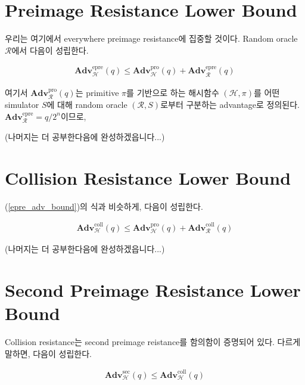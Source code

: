 \documentclass{article}
\newcommand{\adv}{\mathbf{Adv}}
\begin{document}
  \section{Preimage Resistance Lower Bound}
  우리는 여기에서 everywhere preimage resistance에 집중할 것이다.\cite{rogaway_cryptographic_2004} Random oracle \(\mathcal{R}\)에서 다음이 성립한다.\cite{andreeva_security_2011}

  \begin{align}\label{epre_adv_bound}
    \adv^\text{epre}_\mathcal{H}(q) \leq \adv^\text{pro}_\mathcal{H}(q) + \adv^\text{epre}_\mathcal{R}(q)
  \end{align}

  여기서 \(\adv^\text{pro}_\mathcal{R}(q)\)는 primitive \(\pi\)를 기반으로 하는 해시함수 \((\mathcal{H}, \pi)\)를 어떤 simulator \(S\)에 대해 random oracle \((\mathcal{R}, S)\)로부터 구분하는 advantage로 정의된다. \(\adv^\text{epre}_\mathcal{R}=q/2^n\)이므로,

  (나머지는 더 공부한다음에 완성하겠읍니다...)

  \section{Collision Resistance Lower Bound}
  (\ref{epre_adv_bound})의 식과 비슷하게, 다음이 성립한다.

  \begin{align*}
    \adv^\text{coll}_\mathcal{H}(q) \leq \adv^\text{pro}_\mathcal{H}(q) + \adv^\text{coll}_\mathcal{R}(q)
  \end{align*}

  (나머지는 더 공부한다음에 완성하겠읍니다...)

  \section{Second Preimage Resistance Lower Bound}
  Collision resistance는 second preimage reistance를 함의함이 증명되어 있다.\cite{rogaway_cryptographic_2004} 다르게 말하면, 다음이 성립한다.

  \begin{align*}
    \adv^\text{sec}_\mathcal{H}(q) \leq \adv^\text{coll}_\mathcal{H}(q)
  \end{align*}

  \printbibliography
\end{document}
